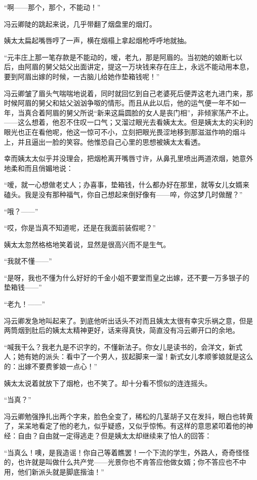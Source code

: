 \par “啊——那个，那个，不能动！”
\par 冯云卿陡的跳起来说，几乎带翻了烟盘里的烟灯。
\par 姨太太扁起嘴唇哼了一声，横在烟榻上拿起烟枪呼呼地就抽。
\par “元丰庄上那一笔存款是不能动的，嗳，老九，那是阿眉的。当初她的娘断七以后，由阿眉的舅父姑父出面讲定，提这一万块钱来存在庄上，永远不能动用本息，要到阿眉出嫁的时候，一古脑儿给她作垫箱钱呢！”
\par 冯云卿皱了眉头气喘喘地说着，同时就回忆到自己老婆死后便弄这老九进门来，那时候阿眉的舅父和姑父汹汹争呶的情形。而且从此以后，他的运气便一年不如一年，当真合着阿眉的舅父所说“新来这扁圆脸的女人是丧门相”，非倾家荡产不止。——这么想着，他忍不住叹一口气；又溜过眼光去看姨太太。但是姨太太的尖利的眼光也正在看他呢，他这一惊可不小，立刻把眼光畏涩地移到那滋滋作响的烟斗上，并且逼出一脸的笑容。他惟恐自己心里的思想被姨太太看透。
\par 幸而姨太太似乎并没理会，把烟枪离开嘴唇寸许，从鼻孔里喷出两道浓烟，她意外地柔和而且俏媚地说：
\par “嗳，就一心想做老丈人；办喜事，垫箱钱，什么都办好在那里，就等女儿女婿来磕头。我是没有那种福气，你自己想起来倒好像有——啐，你这梦几时做醒？”
\par “哦？——”
\par “哎，你是当真不知道呢，还是在我面前装假呢？”
\par 姨太太忽然格格地笑着说，显然是很高兴而不是生气。
\par “我就不懂——”
\par “是呀，我也不懂为什么好好的千金小姐不要堂而皇之出嫁，还不要一万多银子的垫箱钱——”
\par “老九！——”
\par 冯云卿发急地叫起来了。到底他听出话头不对而且姨太太很有幸灾乐祸之意，但是两筒烟到肚后的姨太太精神更好，话来得真快，简直没有冯云卿开口的余地。
\par “喊我干么？我老九是不识字的，不懂新法子。你女儿是读书的，会洋文，新式人；她有她的派头：看中了一个男人，拔起脚来一溜！新式女儿孝顺爹娘就是这么的：出嫁不要费爹娘一点心！”
\par 姨太太说着就放下了烟枪，也不笑了。却十分看不惯似的连连摇头。
\par “当真？”
\par 冯云卿勉强挣扎出两个字来，脸色全变了，稀松的几茎胡子又在发抖，眼白也转黄了，呆呆地看定了他的老九，似乎疑惑，又似乎惊怖。有这样的意思紧叩着他的神经：自由？自由就一定得逃走？但是姨太太却继续来了怕人的回答：
\par “当真么！噢，是我造谣！你自己等着瞧罢！一个下流的学生，外路人，奇奇怪怪的，也许就是叫做什么共产党——光景你也不肯答应他做女婿；你不答应也不中用，他们新派头就是脚底揩油！”
